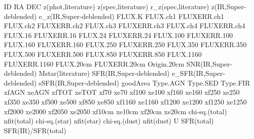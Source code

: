 ID
RA
DEC
z(phot,literature)
z(spec,literature)
r_z(spec,literature)
z(IR,Super-deblended)
e_z(IR,Super-deblended)
FLUX.K
FLUX.ch1
FLUXERR.ch1
FLUX.ch2
FLUXERR.ch2
FLUX.ch3
FLUXERR.ch3
FLUX.ch4
FLUXERR.ch4
FLUX.16
FLUXERR.16
FLUX.24
FLUXERR.24
FLUX.100
FLUXERR.100
FLUX.160
FLUXERR.160
FLUX.250
FLUXERR.250
FLUX.350
FLUXERR.350
FLUX.500
FLUXERR.500
FLUX.850
FLUXERR.850
FLUX.1160
FLUXERR.1160
FLUX.20cm
FLUXERR.20cm
Origin.20cm
SNR(IR,Super-deblended)
Mstar(literature)
SFR(IR,Super-deblended)
e_SFR(IR,Super-deblended)
sSFR(IR,Super-deblended)
goodArea
Type.AGN
Type.SED
Type.FIR
xfAGN
xeAGN
xfTOT
xeTOT
xf70
xe70
xf100
xe100
xf160
xe160
xf250
xe250
xf350
xe350
xf500
xe500
xf850
xe850
xf1160
xe1160
xf1200
xe1200
xf1250
xe1250
xf2000
xe2000
xf2050
xe2050
xf10cm
xe10cm
xf20cm
xe20cm
chi-sq.(total)
nfit(total)
chi-sq.(star)
nfit(star)
chi-sq.(dust)
nfit(dust)
U
SFR(total)
SFR(IR)/SFR(total)